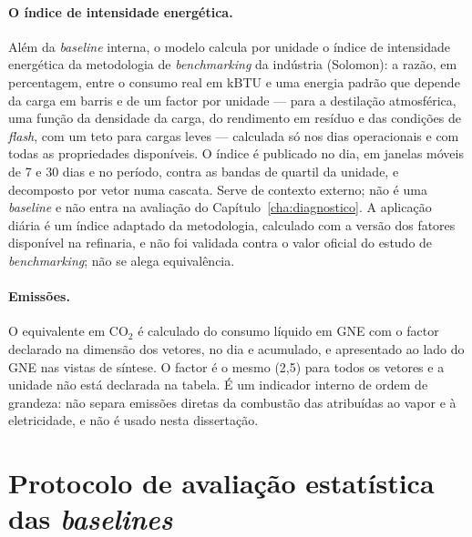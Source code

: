 \paragraph{O índice de intensidade energética.} Além da \emph{baseline}
interna, o modelo calcula por unidade o índice de intensidade energética
da metodologia de \emph{benchmarking} da indústria
(Solomon): a razão,
em percentagem, entre o consumo real em kBTU e uma energia padrão que
depende da carga em barris e de um factor por unidade --- para a
destilação atmosférica, uma função da densidade da carga, do rendimento em
resíduo e das condições de \emph{flash}, com um teto para cargas leves ---
calculada só nos dias operacionais e com todas as propriedades disponíveis.
O índice é publicado no dia, em janelas móveis de 7 e 30 dias e no
período, contra as bandas de quartil da unidade, e decomposto por vetor
numa cascata. Serve de contexto externo; não é uma \emph{baseline} e não
entra na avaliação do Capítulo~\ref{cha:diagnostico}. A aplicação diária é
um índice adaptado da metodologia, calculado com a versão dos fatores
disponível na refinaria, e não foi validada contra o valor oficial do
estudo de \emph{benchmarking}; não se alega equivalência.

\paragraph{Emissões.} O equivalente em CO$_2$ é calculado do consumo
líquido em GNE com o factor declarado na dimensão dos
vetores, no dia e
acumulado, e apresentado ao lado do GNE nas vistas de síntese. O factor é o
mesmo (2,5) para todos os vetores e a unidade não está declarada na tabela.
É um indicador interno de ordem de grandeza: não separa emissões diretas da
combustão das atribuídas ao vapor e à eletricidade, e não é usado nesta
dissertação.

\section{Protocolo de avaliação estatística das \emph{baselines}}
\label{sec:protocolo-baselines}

